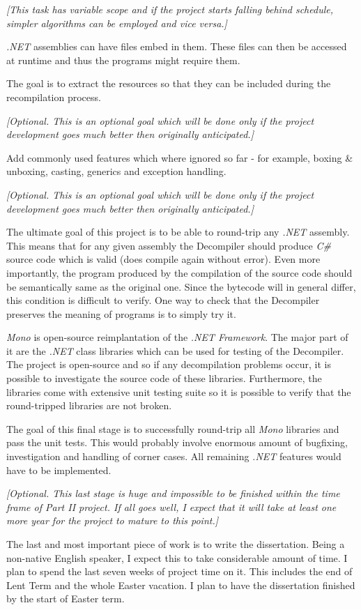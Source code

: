 \documentclass[12pt]{article}
\begin{document}
\begin{enumerate}
\emph{[This task has variable scope and if the project starts falling behind 
schedule, simpler algorithms can be employed and vice versa.]}

\emph{.NET} assemblies can have files embed in them.  These files can then 
be accessed at runtime and thus the programs might require them.

The goal is to extract the resources so that they can be included during 
the recompilation process.

\emph{[Optional.  This is an optional goal which will be done only if the 
project development goes much better then originally anticipated.]}

Add commonly used features which where ignored so far - for example, 
boxing \& unboxing, casting, generics and exception handling.

\emph{[Optional.  This is an optional goal which will be done only if the 
project development goes much better then originally anticipated.]}

The ultimate goal of this project is to be able to round-trip any 
\emph{.NET} assembly.  This means that for any given assembly the 
Decompiler should produce \emph{C\#} source code which is valid (does 
compile again without error).  Even more importantly, the program produced 
by the compilation of the source code should be semantically same as the 
original one.  Since the bytecode will in general differ, this condition is 
difficult to verify.  One way to check that the Decompiler preserves the 
meaning of programs is to simply try it.

\emph{Mono} is open-source reimplantation of the \emph{.NET Framework}.
The major part of it are the \emph{.NET} class libraries which can be 
used for testing of the Decompiler.  The project is open-source and so if 
any decompilation problems occur, it is possible to investigate the 
source code of these libraries.  Furthermore, the libraries come with 
extensive unit testing suite so it is possible to verify that the 
round-tripped libraries are not broken.

The goal of this final stage is to successfully round-trip all \emph{Mono} 
libraries and pass the unit tests.  This would probably involve enormous 
amount of bugfixing, investigation and handling of corner cases.  All 
remaining \emph{.NET} features would have to be implemented.

\emph{[Optional.  This last stage is huge and impossible to be finished 
within the time frame of Part II project.  If all goes well, I expect 
that it will take at least one more year for the project to mature to 
this point.]}

The last and most important piece of work is to write the dissertation.
Being a non-native English speaker, I expect this to take considerable
amount of time.  I plan to spend the last seven weeks of project time
on it.  This includes the end of Lent Term and the whole Easter vacation.
I plan to have the dissertation finished by the start of Easter term.

\end{enumerate}
\end{document}
